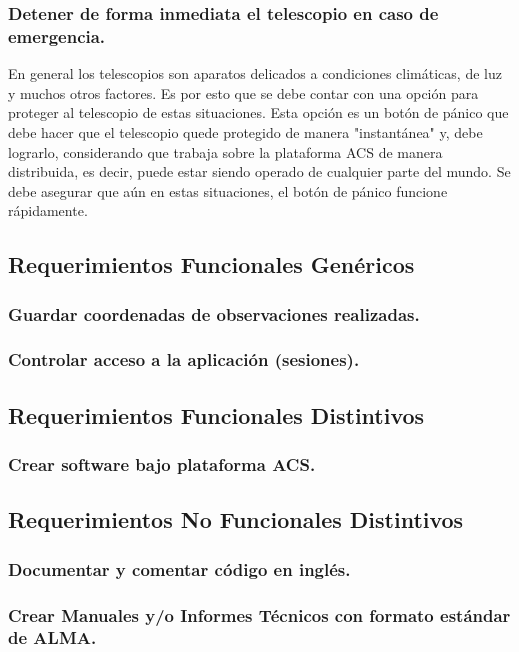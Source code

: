 \documentclass[letterpaper,spanish,10pt]{article}
\begin{document}

\subsubsection{Detener de forma inmediata el telescopio en caso de emergencia.}
En general los telescopios son aparatos delicados a condiciones climáticas, de luz y muchos otros factores. Es por esto que se debe contar con una opción para proteger al telescopio de estas situaciones. Esta opción es un botón de pánico que debe hacer que el telescopio quede protegido de manera "instantánea" y, debe lograrlo, considerando que trabaja sobre la plataforma ACS de manera distribuida, es decir, puede estar siendo operado de cualquier parte del mundo. Se debe asegurar que aún en estas situaciones, el botón de pánico funcione rápidamente.



\subsection{Requerimientos Funcionales Gen\'ericos}
\subsubsection{Guardar coordenadas de observaciones realizadas.}

\subsubsection{Controlar acceso a la aplicaci\'on (sesiones).}



\subsection{Requerimientos Funcionales Distintivos}
\subsubsection{Crear software bajo plataforma ACS.}



\subsection{Requerimientos No Funcionales Distintivos}
\subsubsection{Documentar y comentar c\'odigo en ingl\'es.}

\subsubsection{Crear Manuales y/o Informes T\'ecnicos con formato est\'andar de ALMA.}
\end{document}

